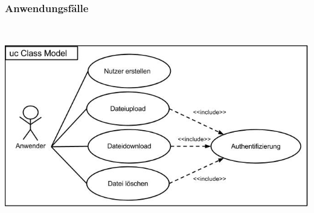 \documentclass[12pt,a4paper,bibliography=totocnumbered,listof=totocnumbered]{scrartcl}
\begin{document}
\pagebreak

\subsubsection{Anwendungsfälle}
\vspace{1em}
$\;$\\
\begin{minipage}{\linewidth}
	\centering
	\includegraphics[width=0.8\linewidth]{UseCase.jpg}
\end{minipage}
\vspace{1em}
\end{document}
